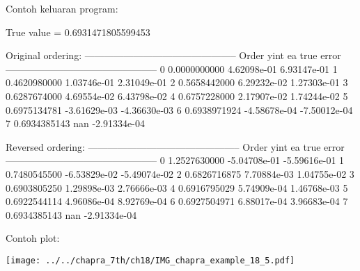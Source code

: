 Contoh keluaran program:
\begin{textcode}
True value =  0.6931471805599453

Original ordering:
-----------------------------------------------
Order        yint          ea        true error
-----------------------------------------------
 0       0.0000000000  4.62098e-01  6.93147e-01
 1       0.4620980000  1.03746e-01  2.31049e-01
 2       0.5658442000  6.29232e-02  1.27303e-01
 3       0.6287674000  4.69554e-02  6.43798e-02
 4       0.6757228000  2.17907e-02  1.74244e-02
 5       0.6975134781 -3.61629e-03 -4.36630e-03
 6       0.6938971924 -4.58678e-04 -7.50012e-04
 7       0.6934385143          nan -2.91334e-04
    
Reversed ordering:
-----------------------------------------------
Order        yint          ea        true error
-----------------------------------------------
 0       1.2527630000 -5.04708e-01 -5.59616e-01
 1       0.7480545500 -6.53829e-02 -5.49074e-02
 2       0.6826716875  7.70884e-03  1.04755e-02
 3       0.6903805250  1.29898e-03  2.76666e-03
 4       0.6916795029  5.74909e-04  1.46768e-03
 5       0.6922544114  4.96086e-04  8.92769e-04
 6       0.6927504971  6.88017e-04  3.96683e-04
 7       0.6934385143          nan -2.91334e-04    
\end{textcode}

Contoh plot:

{\centering
\texttt{[image: ../../chapra\_7th/ch18/IMG\_chapra\_example\_18\_5.pdf]}
\par}

